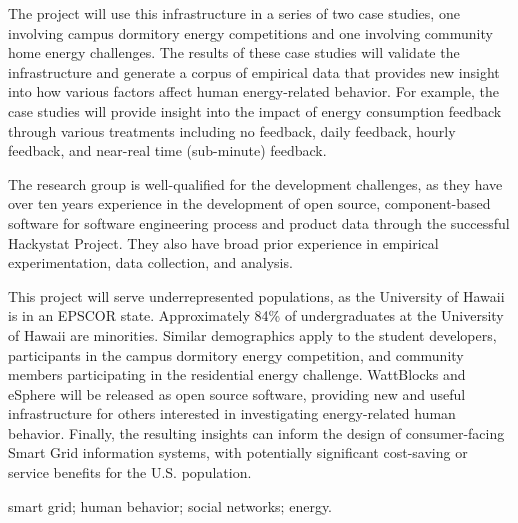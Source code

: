 The project will use this infrastructure in a series of two case studies, one
involving campus dormitory energy competitions and one involving community
home energy challenges.  The results of these case studies will validate
the infrastructure and generate a corpus of empirical data that provides
new insight into how various factors affect human energy-related
behavior. For example, the case studies will provide insight into the
impact of energy consumption feedback through various treatments including
no feedback, daily feedback, hourly feedback, and near-real time
(sub-minute) feedback.

The research group is well-qualified for the development challenges, as
they have over ten years experience in the development of open source,
component-based software for software engineering process and product data
through the successful Hackystat Project.  They also have broad prior experience
in empirical experimentation, data collection, and analysis. 

\medskip 

This project will serve underrepresented populations, as the University of
Hawaii is in an EPSCOR state. Approximately 84\% of undergraduates at the
University of Hawaii are minorities. Similar demographics apply to the
student developers, participants in the campus dormitory energy
competition, and community members participating in the residential energy
challenge.  WattBlocks and eSphere will be released as open source
software, providing new and useful infrastructure for others interested in
investigating energy-related human behavior.  Finally, the resulting
insights can inform the design of consumer-facing Smart Grid information
systems, with potentially significant cost-saving or service benefits for
the U.S. population.

\medskip

 smart grid; human behavior; social networks;
energy.





